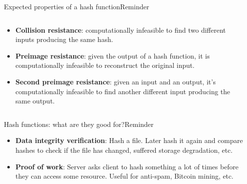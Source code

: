 \documentclass[aspectratio=169, lualatex, handout]{beamer}
\begin{document}
\begin{frame}{Expected properties of a hash function}{Reminder}
	\begin{columns}[c]
		\begin{column}{0.6\textwidth}
			\begin{itemize}[<+->]
				\item \textbf{Collision resistance}: computationally infeasible to find
				      two different inputs producing the same hash.
				\item \textbf{Preimage resistance}: given the output of a hash function,
				      it is computationally infeasible to reconstruct the original input.
				\item \textbf{Second preimage resistance}: given an input and an output,
				      it's computationally infeasible to find another different input
				      producing the same output.
			\end{itemize}
		\end{column}
		\begin{column}{0.4\textwidth}
		\end{column}
	\end{columns}
\end{frame}

\begin{frame}{Hash functions: what are they good for?}{Reminder}
	\begin{itemize}[<+->]
		\item \textbf{Data integrity verification}: Hash a file. Later hash it
		      again and compare hashes to check if the file has changed, suffered storage
		      degradation, etc.
		\item \textbf{Proof of work}: Server asks client to hash something a lot of
		      times before they can access some resource. Useful for anti-spam, Bitcoin
		      mining, etc.
	\end{itemize}
\end{frame}
\end{document}
